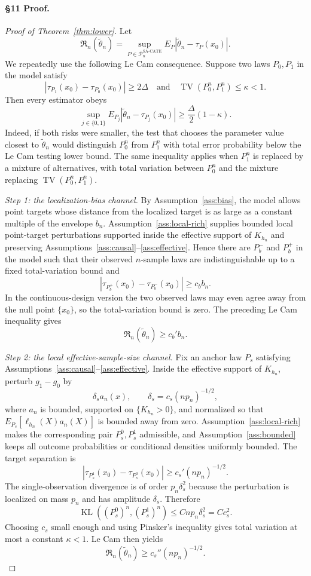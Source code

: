 \paragraph{\S11 Proof.}
\begin{proof}[Proof of Theorem~\ref{thm:lower}]
Let
\[
  \mathfrak R_n(\tilde\theta_n)
  =
  \sup_{P\in\mathcal{P}_n^{\mathrm{SA\text{-}CATE}}}
  E_P|\tilde\theta_n-\tau_P(x_0)|.
\]
We repeatedly use the following Le Cam consequence.  Suppose two laws $P_0,P_1$ in the model satisfy
\[
  |\tau_{P_1}(x_0)-\tau_{P_0}(x_0)|\ge 2\Delta
  \quad\text{and}\quad
  \operatorname{TV}(P_0^n,P_1^n)\le \kappa<1 .
\]
Then every estimator obeys
\[
  \sup_{j\in\{0,1\}}E_{P_j}|\tilde\theta_n-\tau_{P_j}(x_0)|
  \ge
  \frac{\Delta}{2}(1-\kappa).
\]
Indeed, if both risks were smaller, the test that chooses the parameter value closest to $\tilde\theta_n$ would distinguish $P_0^n$ from $P_1^n$ with total error probability below the Le Cam testing lower bound.  The same inequality applies when $P_1^n$ is replaced by a mixture of alternatives, with total variation between $P_0^n$ and the mixture replacing $\operatorname{TV}(P_0^n,P_1^n)$.

\emph{Step 1: the localization-bias channel.}
By Assumption~\ref{ass:bias}, the model allows point targets whose distance from the localized target is as large as a constant multiple of the envelope $b_n$.  Assumption~\ref{ass:local-rich} supplies bounded local point-target perturbations supported inside the effective support of $K_{h_n}$ and preserving Assumptions~\ref{ass:causal}--\ref{ass:effective}.  Hence there are $P_b^-$ and $P_b^+$ in the model such that their observed $n$-sample laws are indistinguishable up to a fixed total-variation bound and
\[
  |\tau_{P_b^+}(x_0)-\tau_{P_b^-}(x_0)|\ge c_b b_n .
\]
In the continuous-design version the two observed laws may even agree away from the null point $\{x_0\}$, so the total-variation bound is zero.  The preceding Le Cam inequality gives
\[
  \mathfrak R_n(\tilde\theta_n)\ge c_b' b_n .
\]

\emph{Step 2: the local effective-sample-size channel.}
Fix an anchor law $P_s$ satisfying Assumptions~\ref{ass:causal}--\ref{ass:effective}.  Inside the effective support of $K_{h_n}$, perturb $g_1-g_0$ by
\[
  \delta_s a_n(x),\qquad
  \delta_s=c_s(n p_n)^{-1/2},
\]
where $a_n$ is bounded, supported on $\{K_{h_n}>0\}$, and normalized so that
$E_{P_s}[\ell_{h_n}(X)a_n(X)]$ is bounded away from zero.  Assumption~\ref{ass:local-rich} makes the corresponding pair $P_s^0,P_s^1$ admissible, and Assumption~\ref{ass:bounded} keeps all outcome probabilities or conditional densities uniformly bounded.  The target separation is
\[
  |\tau_{P_s^1}(x_0)-\tau_{P_s^0}(x_0)|
  \ge c_s'(n p_n)^{-1/2}.
\]
The single-observation divergence is of order $p_n\delta_s^2$ because the perturbation is localized on mass $p_n$ and has amplitude $\delta_s$.  Therefore
\[
  \operatorname{KL}\!\left((P_s^0)^n,(P_s^1)^n\right)
  \le C n p_n\delta_s^2
  = Cc_s^2 .
\]
Choosing $c_s$ small enough and using Pinsker's inequality gives total variation at most a constant $\kappa<1$.  Le Cam then yields
\[
  \mathfrak R_n(\tilde\theta_n)\ge c_s''(n p_n)^{-1/2}.
\]


\end{proof}
